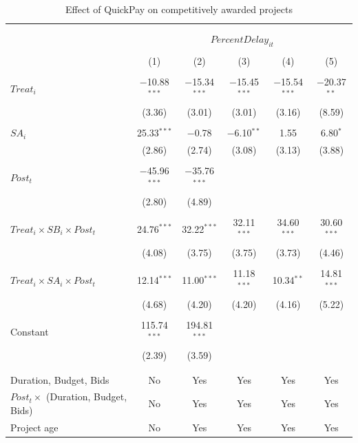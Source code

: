 \documentclass[
]{article}
\begin{document}
\begin{table}[H] \centering 
  \caption{Effect of QuickPay on competitively awarded projects} 
  \label{} 
\small 
\begin{tabular}{@{\extracolsep{-2pt}}lccccc} 
\\[-1.8ex]\hline 
\hline \\[-1.8ex] 
\\[-1.8ex] & \multicolumn{5}{c}{$PercentDelay_{it}$  } \\ 
\\[-1.8ex] & (1) & (2) & (3) & (4) & (5)\\ 
\hline \\[-1.8ex] 
 $Treat_i$ & $-$10.88$^{***}$ & $-$15.34$^{***}$ & $-$15.45$^{***}$ & $-$15.54$^{***}$ & $-$20.37$^{**}$ \\ 
  & (3.36) & (3.01) & (3.01) & (3.16) & (8.59) \\ 
  & & & & & \\ 
 $SA_i$ & 25.33$^{***}$ & $-$0.78 & $-$6.10$^{**}$ & 1.55 & 6.80$^{*}$ \\ 
  & (2.86) & (2.74) & (3.08) & (3.13) & (3.88) \\ 
  & & & & & \\ 
 $Post_t$ & $-$45.96$^{***}$ & $-$35.76$^{***}$ &  &  &  \\ 
  & (2.80) & (4.89) &  &  &  \\ 
  & & & & & \\ 
 $Treat_i \times SB_i \times Post_t$ & 24.76$^{***}$ & 32.22$^{***}$ & 32.11$^{***}$ & 34.60$^{***}$ & 30.60$^{***}$ \\ 
  & (4.08) & (3.75) & (3.75) & (3.73) & (4.46) \\ 
  & & & & & \\ 
 $Treat_i \times SA_i \times Post_t$ & 12.14$^{***}$ & 11.00$^{***}$ & 11.18$^{***}$ & 10.34$^{**}$ & 14.81$^{***}$ \\ 
  & (4.68) & (4.20) & (4.20) & (4.16) & (5.22) \\ 
  & & & & & \\ 
 Constant & 115.74$^{***}$ & 194.81$^{***}$ &  &  &  \\ 
  & (2.39) & (3.59) &  &  &  \\ 
  & & & & & \\ 
\hline \\[-1.8ex] 
Duration, Budget, Bids & No & Yes & Yes & Yes & Yes \\ 
$Post_t \times $  (Duration, Budget, Bids) & No & Yes & Yes & Yes & Yes \\ 
Project age & No & Yes & Yes & Yes & Yes \\ 

\end{tabular}
\end{table}
\end{document}
